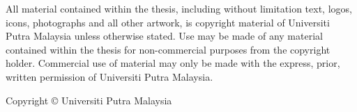 \thispagestyle{empty}
All material contained within the thesis, including without limitation text, logos, icons, photographs and all other artwork, is copyright material of Universiti Putra Malaysia unless otherwise stated. Use may be made of any material contained within the thesis for non-commercial purposes from the copyright holder. Commercial use of material may only be made with the express, prior, written permission of Universiti Putra Malaysia.
    
Copyright \copyright{ Universiti Putra Malaysia}